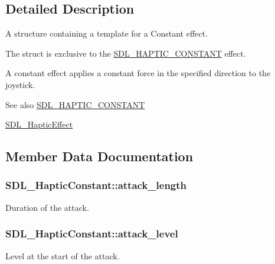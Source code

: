 \subsection{Detailed Description}
A structure containing a template for a Constant effect. 

The struct is exclusive to the \hyperlink{SDL__haptic_8h_a955fb9f680dcf9cc72a3d5263e85b80a}{S\+D\+L\+\_\+\+H\+A\+P\+T\+I\+C\+\_\+\+C\+O\+N\+S\+T\+A\+N\+T} effect.

A constant effect applies a constant force in the specified direction to the joystick.

\begin{DoxySeeAlso}{See also}
\hyperlink{SDL__haptic_8h_a955fb9f680dcf9cc72a3d5263e85b80a}{S\+D\+L\+\_\+\+H\+A\+P\+T\+I\+C\+\_\+\+C\+O\+N\+S\+T\+A\+N\+T} 

\hyperlink{unionSDL__HapticEffect}{S\+D\+L\+\_\+\+Haptic\+Effect} 
\end{DoxySeeAlso}


\subsection{Member Data Documentation}
\hypertarget{structSDL__HapticConstant_a907bade68ab53fb24e7d2651d19b767f}{}
\subsubsection[{attack\+\_\+length}]{ S\+D\+L\+\_\+\+Haptic\+Constant\+::attack\+\_\+length}\label{structSDL__HapticConstant_a907bade68ab53fb24e7d2651d19b767f}
Duration of the attack. \hypertarget{structSDL__HapticConstant_a0928a37f3fab0e5b7daffc7a1d65744c}{}
\subsubsection[{attack\+\_\+level}]{ S\+D\+L\+\_\+\+Haptic\+Constant\+::attack\+\_\+level}\label{structSDL__HapticConstant_a0928a37f3fab0e5b7daffc7a1d65744c}
Level at the start of the attack. \hypertarget{structSDL__HapticConstant_aa65321f1b002adaab6e629d5bed556e9}{}
